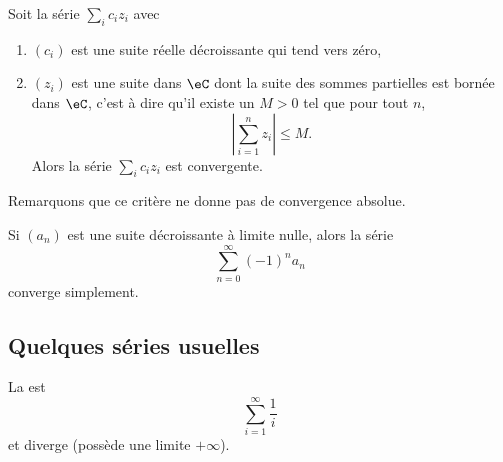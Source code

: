 \begin{proposition}
    Soit la série $\sum_i c_iz_i$ avec
    \begin{enumerate}
        \item $(c_i)$ est une suite réelle décroissante qui tend vers zéro,
        \item $(z_i)$ est une suite dans $\eC$ dont la suite des sommes partielles est bornée dans $\eC$, c'est à dire qu'il existe un $M>0$ tel que pour tout $n$,
        \begin{equation}
            \left| \sum_{i=1}^nz_i \right| \leq M.
        \end{equation}
        Alors la série $\sum_ic_iz_i$ est convergente.
    \end{enumerate}
\end{proposition}
Remarquons que ce critère ne donne pas de convergence absolue.

\begin{corollary}       \label{CoreMjIfw}
    Si \( (a_n)\) est une suite décroissante à limite nulle, alors la série
  \begin{equation}
    \sum_{n=0}^\infty {(-1)}^n a_n
  \end{equation}
  converge simplement.
\end{corollary}

\subsection{Quelques séries usuelles}

\begin{example}
    La  est
    \begin{equation}
        \sum_{i=1}^\infty \frac1i
    \end{equation}
    et diverge (possède une limite $+\infty$).
\end{example}

